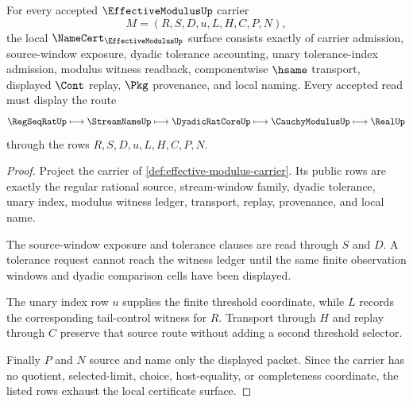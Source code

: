 \begin{theorem}
\label{thm:effective-modulus-namecert-obligations}
For every accepted $\EffectiveModulusUp$ carrier
$$
M=(R,S,D,u,L,H,C,P,N),
$$
the local $\NameCert_{\EffectiveModulusUp}$ surface consists exactly of carrier admission, source-window exposure, dyadic tolerance accounting, unary tolerance-index admission, modulus witness readback, componentwise $\hsame$ transport, displayed $\Cont$ replay, $\Pkg$ provenance, and local naming. Every accepted read must display the route
$$
\RegSeqRatUp \longmapsto \StreamNameUp \longmapsto \DyadicRatCoreUp \longmapsto \CauchyModulusUp \longmapsto \RealUp
$$
through the rows $R,S,D,u,L,H,C,P,N$.
\end{theorem}
\begin{proof}
Project the carrier of \autoref{def:effective-modulus-carrier}. Its public rows are exactly the regular rational source, stream-window family, dyadic tolerance, unary index, modulus witness ledger, transport, replay, provenance, and local name.

The source-window exposure and tolerance clauses are read through $S$ and $D$. A tolerance request cannot reach the witness ledger until the same finite observation windows and dyadic comparison cells have been displayed.

The unary index row $u$ supplies the finite threshold coordinate, while $L$ records the corresponding tail-control witness for $R$. Transport through $H$ and replay through $C$ preserve that source route without adding a second threshold selector.

Finally $P$ and $N$ source and name only the displayed packet. Since the carrier has no quotient, selected-limit, choice, host-equality, or completeness coordinate, the listed rows exhaust the local certificate surface.
\end{proof}

